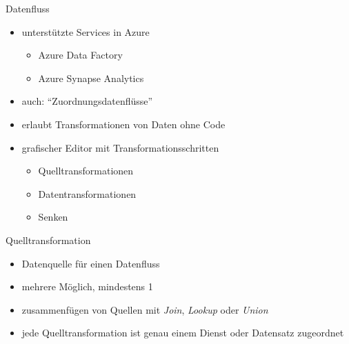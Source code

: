 

\begin{flashcard}[Definition]{Datenfluss}
  \begin{itemize}
    \item unterstützte Services in Azure
      \begin{itemize}
        \item Azure Data Factory
        \item Azure Synapse Analytics
      \end{itemize}
    \item auch: ``Zuordnungsdatenflüsse''
    \item erlaubt Transformationen von Daten ohne Code
    \item grafischer Editor mit Transformationsschritten
      \begin{itemize}
        \item Quelltransformationen
        \item Datentransformationen
        \item Senken
      \end{itemize}
  \end{itemize}
\end{flashcard}

\begin{flashcard}[Definition]{Quelltransformation}
  \begin{itemize}
    \item Datenquelle für einen Datenfluss
    \item mehrere Möglich, mindestens 1
    \item zusammenfügen von Quellen mit \emph{Join}, \emph{Lookup} oder \emph{Union}
    \item jede Quelltransformation ist genau einem Dienst oder Datensatz zugeordnet
  \end{itemize}
\end{flashcard}

